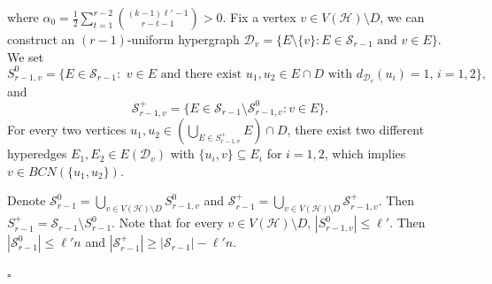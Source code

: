 \documentclass[12pt]{article}%
\newenvironment{proof}{{\noindent\it Proof.}}{\hfill $\square$\par}
\newcommand{\mh}{\mathcal{H}}
\begin{document}
\begin{proof}
\begin{equation}
     \end{equation}
      where $
     \alpha_0=\frac{1}{2}\sum_{t=1}^{r-2}\binom{(k-1)\ell'-1}{r-t-1}>0$.
          Fix a vertex $v\in V(\mh)\setminus D$, we can construct an $(r-1)$-uniform hypergraph $\mathcal{D}_v=\{E\setminus \{v\}: E\in \mathcal{S}_{r-1} \text{~and $v\in E$}\}$. %
    We set $$S_{r-1,v}^0=\{E\in \mathcal{S}_{r-1}: \text{~$v\in E$ and there exist $u_1,u_2\in E\cap D$ with $d_{\mathcal{D}_v}(u_i)=1$, $i=1,2$}\},$$
    and $$\mathcal{S}^+_{r-1,v}=\{E\in \mathcal{S}_{r-1}\setminus\mathcal{S}_{r-1,v}^0:\text{$v\in E$}\}.$$
    For every two vertices $u_1,u_2\in \left(\bigcup_{E\in S^+_{r-1,v}}E\right)\cap D$, there exist two different hyperedges $E_1,E_2\in E(\mathcal{D}_{v})$ with $\{u_i,v\}\subseteq E_i$ for $i=1,2$, which implies $v\in BCN(\{u_1,u_2\})$.

   Denote $\mathcal{S}_{r-1}^0=\bigcup_{v\in V(\mh)\setminus D} S_{r-1,v}^0$ and $\mathcal{S}^+_{r-1}=\bigcup_{v\in V(\mh)\setminus D}\mathcal{S}_{r-1,v}^+$. Then $S^+_{r-1}=\mathcal{S}_{r-1}\setminus S_{r-1}^0$. Note that for every $v\in V(\mh)\setminus D$,  $|S_{r-1,v}^0|\leq \ell'$. Then $|\mathcal{S}_{r-1}^0|\leq \ell' n$ and $|\mathcal{S}_{r-1}^+|\geq |\mathcal{S}_{r-1}|-\ell' n$.


\end{proof}
\end{document}

